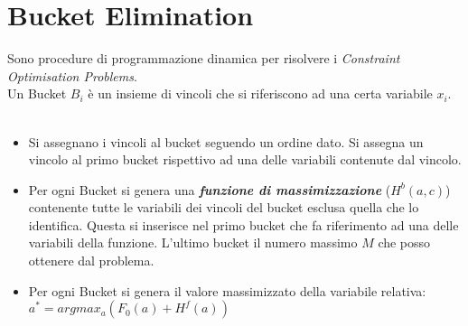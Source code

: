 \documentclass[a4paper, notitlepage, 9pt]{extreport}
\begin{document}
\section*{Bucket Elimination}
Sono procedure di programmazione dinamica per risolvere i \textit{Constraint Optimisation Problems}.\\
Un Bucket $B_i$ è un insieme di vincoli che si riferiscono ad una certa variabile $x_i$.\\\\
\begin{itemize}
	\item Si assegnano i vincoli al bucket seguendo un ordine dato. Si assegna un vincolo al primo bucket rispettivo ad una delle variabili contenute dal vincolo.
	\item Per ogni Bucket si genera una \textit{\textbf{funzione di massimizzazione}} ($H^b(a, c)$) contenente tutte le variabili dei vincoli del bucket esclusa quella che lo identifica. Questa si inserisce nel primo bucket che fa riferimento ad una delle variabili della funzione. L'ultimo bucket il numero massimo $M$ che posso ottenere dal problema.
	\item Per ogni Bucket si genera il valore massimizzato della variabile relativa: $a^* = argmax_a (F_0(a) + H^f(a))$
\end{itemize}
\end{document}
